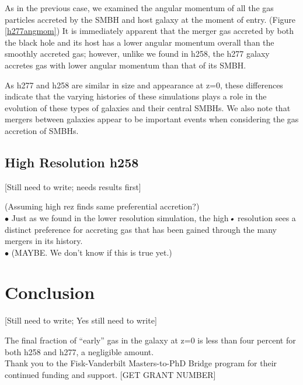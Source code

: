 \documentclass[manuscript]{aastex}
\begin{document}
As in the previous case, we examined the angular momentum of all the gas particles accreted by the SMBH and host galaxy at the moment of entry. (Figure \ref{h277angmom}) It is immediately apparent that the merger gas accreted by both the black hole and its host has a lower angular momentum overall than the smoothly accreted gas; however, unlike we found in h258, the h277 galaxy accretes gas with lower angular momentum than that of its SMBH.

As h277 and h258 are similar in size and appearance at z=0, these differences indicate that the varying histories of these simulations plays a role in the evolution of these types of galaxies and their central SMBHs. We also note that mergers between galaxies appear to be important events when considering the gas accretion of SMBHs.
	

\subsection{High Resolution h258}

[Still need to write; needs results first]

(Assuming high rez finds same preferential accretion?)\\
$\bullet$ Just as we found in the lower resolution simulation, the high\textit{•} resolution sees a distinct preference for accreting gas that has been gained through the many mergers in its history. \\
$\bullet$ (MAYBE. We don't know if this is true yet.)\\


\section{Conclusion}

[Still need to write; Yes still need to write]

The final fraction of ``early'' gas in the galaxy at z=0 is less than four percent for both h258 and h277, a negligible amount.  \\


\acknowledgments
Thank you to the Fisk-Vanderbilt Masters-to-PhD Bridge program for their continued funding and support. [GET GRANT NUMBER]

\end{document}
